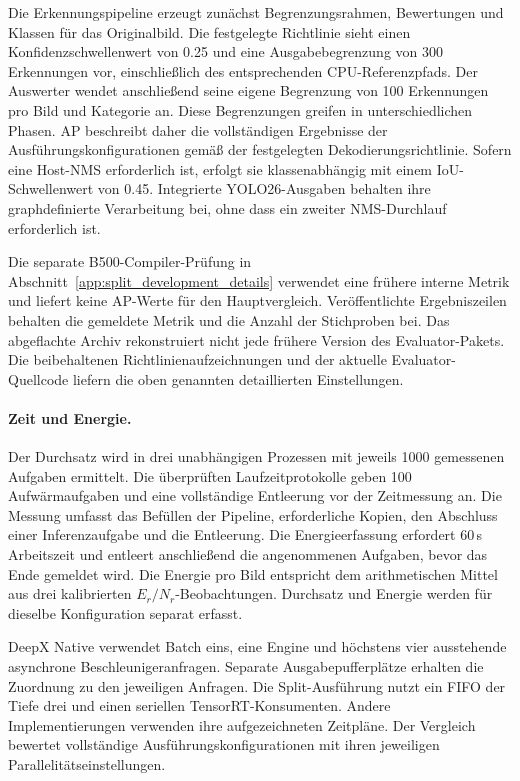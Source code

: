 Die Erkennungspipeline erzeugt zunächst Begrenzungsrahmen, Bewertungen und Klassen für das Originalbild. Die festgelegte Richtlinie sieht einen Konfidenzschwellenwert von \num{0.25} und eine Ausgabebegrenzung von 300 Erkennungen vor, einschließlich des entsprechenden CPU-Referenzpfads. Der Auswerter wendet anschließend seine eigene Begrenzung von 100 Erkennungen pro Bild und Kategorie an. Diese Begrenzungen greifen in unterschiedlichen Phasen. AP beschreibt daher die vollständigen Ergebnisse der Ausführungskonfigurationen gemäß der festgelegten Dekodierungsrichtlinie. Sofern eine Host-NMS erforderlich ist, erfolgt sie klassenabhängig mit einem IoU-Schwellenwert von 0.45. Integrierte YOLO26-Ausgaben behalten ihre graphdefinierte Verarbeitung bei, ohne dass ein zweiter NMS-Durchlauf erforderlich ist.

Die separate B500-Compiler-Prüfung in Abschnitt~\ref{app:split_development_details} verwendet eine frühere interne Metrik und liefert keine AP-Werte für den Hauptvergleich. Veröffentlichte Ergebniszeilen behalten die gemeldete Metrik und die Anzahl der Stichproben bei. Das abgeflachte Archiv rekonstruiert nicht jede frühere Version des Evaluator-Pakets. Die beibehaltenen Richtlinienaufzeichnungen und der aktuelle Evaluator-Quellcode liefern die oben genannten detaillierten Einstellungen.

\paragraph{Zeit und Energie.}

Der Durchsatz wird in drei unabhängigen Prozessen mit jeweils \num{1000} gemessenen Aufgaben ermittelt. Die überprüften Laufzeitprotokolle geben 100 Aufwärmaufgaben und eine vollständige Entleerung vor der Zeitmessung an. Die Messung umfasst das Befüllen der Pipeline, erforderliche Kopien, den Abschluss einer Inferenzaufgabe und die Entleerung. Die Energieerfassung erfordert 60\,s Arbeitszeit und entleert anschließend die angenommenen Aufgaben, bevor das Ende gemeldet wird. Die Energie pro Bild entspricht dem arithmetischen Mittel aus drei kalibrierten $E_r/N_r$-Beobachtungen. Durchsatz und Energie werden für dieselbe Konfiguration separat erfasst.

DeepX Native verwendet Batch eins, eine Engine und höchstens vier ausstehende asynchrone Beschleunigeranfragen. Separate Ausgabepufferplätze erhalten die Zuordnung zu den jeweiligen Anfragen. Die Split-Ausführung nutzt ein FIFO der Tiefe drei und einen seriellen TensorRT-Konsumenten. Andere Implementierungen verwenden ihre aufgezeichneten Zeitpläne. Der Vergleich bewertet vollständige Ausführungskonfigurationen mit ihren jeweiligen Parallelitätseinstellungen.

